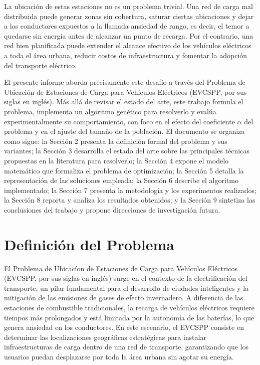 \documentclass[letter, 10pt]{article}
\begin{document}
La ubicación de estas estaciones no es un problema trivial. Una red de carga mal 
distribuida puede generar zonas sin cobertura, saturar ciertas ubicaciones y dejar a los 
conductores expuestos a la llamada ansiedad de rango, es decir, el temor a quedarse sin 
energía antes de alcanzar un punto de recarga. Por el contrario, una red bien planificada 
puede extender el alcance efectivo de los vehículos eléctricos a toda el área urbana, 
reducir costos de infraestructura y fomentar la adopción del transporte eléctrico.

El presente informe aborda precisamente este desafío a través del Problema de Ubicación
de Estaciones de Carga para Vehículos Eléctricos (EVCSPP, por sus siglas en inglés).
Más allá de revisar el estado del arte, este trabajo formula el problema, implementa un
algoritmo genético para resolverlo y evalúa experimentalmente su comportamiento, con foco
en el efecto del coeficiente $\alpha$ del problema y en el ajuste del tamaño de la población.
El documento se organiza como sigue: la Sección 2 presenta la definición formal del problema y sus variantes; la Sección 3 desarrolla el estado del arte sobre las principales técnicas propuestas en la literatura para resolverlo; la Sección 4 expone el modelo matemático que formaliza el problema de optimización; la Sección 5 detalla la representación de las soluciones empleada; la Sección 6 describe el algoritmo implementado; la Sección 7 presenta la metodología y los experimentos realizados; la Sección 8 reporta y analiza los resultados obtenidos; y la Sección 9 sintetiza las conclusiones del trabajo y propone direcciones de investigación futura.

\section{Definici\'on del Problema}

El Problema de Ubicac\'ion de Estaciones de Carga para Veh\'iculos El\'ectricos (EVCSPP, por sus siglas en ingl\'es) surge en el contexto de la electrificaci\'on del transporte, un pilar fundamental para el desarrollo de ciudades inteligentes y la mitigaci\'on de las emisiones de gases de efecto invernadero. A diferencia de las estaciones de combustible tradicionales, la recarga de veh\'iculos el\'ectricos requiere tiempos m\'as prolongados y est\'a limitada por la autonom\'ia de las bater\'ias, lo que genera ansiedad en los conductores. En este escenario, el EVCSPP consiste en determinar las localizaciones geogr\'aficas estrat\'egicas para instalar infraestructuras de carga dentro de una red de transporte, garantizando que los usuarios puedan desplazarse por toda la \'area urbana sin agotar su energ\'ia.
\end{document}
